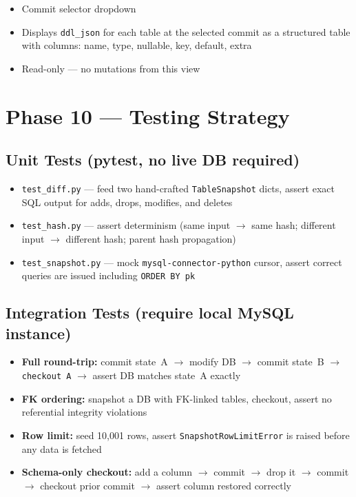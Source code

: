 \documentclass[12pt, a4paper]{article}
\begin{document}
\begin{itemize}[leftmargin=1.5em, itemsep=0.3em]
    \item Commit selector dropdown
    \item Displays \texttt{ddl\_json} for each table at the selected commit
    as a structured table with columns: name, type, nullable, key, default,
    extra
    \item Read-only --- no mutations from this view
\end{itemize}

\section{Phase 10 --- Testing Strategy}

\subsection{Unit Tests (pytest, no live DB required)}

\begin{itemize}[leftmargin=1.5em, itemsep=0.3em]
    \item \texttt{test\_diff.py} --- feed two hand-crafted
    \texttt{TableSnapshot} dicts, assert exact SQL output for adds, drops,
    modifies, and deletes
    \item \texttt{test\_hash.py} --- assert determinism (same input $\to$
    same hash; different input $\to$ different hash; parent hash propagation)
    \item \texttt{test\_snapshot.py} --- mock \texttt{mysql-connector-python}
    cursor, assert correct queries are issued including \texttt{ORDER BY pk}
\end{itemize}

\subsection{Integration Tests (require local MySQL instance)}

\begin{itemize}[leftmargin=1.5em, itemsep=0.3em]
    \item \textbf{Full round-trip:} commit state~A $\to$ modify DB $\to$
    commit state~B $\to$ \texttt{checkout A} $\to$ assert DB matches
    state~A exactly
    \item \textbf{FK ordering:} snapshot a DB with FK-linked tables,
    checkout, assert no referential integrity violations
    \item \textbf{Row limit:} seed 10,001 rows, assert
    \texttt{SnapshotRowLimitError} is raised before any data is fetched
    \item \textbf{Schema-only checkout:} add a column $\to$ commit $\to$
    drop it $\to$ commit $\to$ checkout prior commit $\to$ assert column
    restored correctly
\end{itemize}
\end{document}
